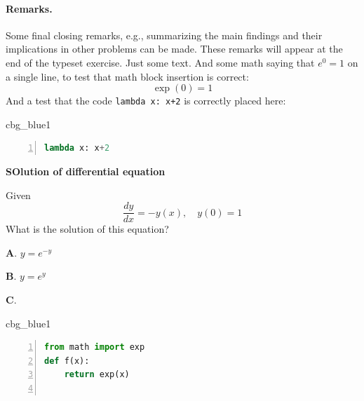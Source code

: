 \documentclass[%
oneside,                 %
final,                   %
10pt]{article}
\newenvironment{_cod_tight}[1]{
   \def\FrameCommand{\colorbox{#1}}
   \FrameRule0.6pt\MakeFramed {\FrameRestore}\vskip3mm}
   {\vskip0mm\endMakeFramed}
\newenvironment{cod}[1]{
\bgroup\rmfamily
\fboxsep=0mm\relax
\begin{_cod_tight}{#1}
\list{}{\parsep=-2mm\parskip=0mm\topsep=0pt\leftmargin=2mm
\rightmargin=2\leftmargin\leftmargin=4pt\relax}
\item\relax}
{\endlist\end{_cod_tight}\egroup}
\newenvironment{doconcequiz}{}{}
\newcounter{doconcequizcounter}
\newenvironment{doconceexercise}{}{}
\newcounter{doconceexercisecounter}
\theoremstyle{definition}
\begin{document}
\begin{enumerate}
\begin{doconceexercise}
\paragraph{Remarks.}
Some final closing remarks, e.g., summarizing the main findings
and their implications in other problems can be made. These
remarks will appear at the end of the typeset exercise.
\end{doconceexercise}
\begin{doconceexercise}
Just some text. And some math saying that $e^0=1$ on a single line,
to test that math block insertion is correct:
\[ \exp{(0)} = 1 \]
And a test that the code \texttt{lambda x: x+2} is correctly placed here:
\begin{cod}{cbg_blue1}\begin{lstlisting}[language=Python,style=myspeciallststyle,numbers=left,numberstyle=\tiny,stepnumber=3,numbersep=15pt,xleftmargin=1mm]
lambda x: x+2

\end{lstlisting}\end{cod}
\noindent

\end{doconceexercise}
\begin{doconceexercise}
                             
\label{sec:this:exer:de}

\begin{doconcequiz}
\label{quiz:diff:eq1}


\noindent\textbf{\large SOlution of differential equation}

\noindent
Given
\[ \frac{dy}{dx} = -y(x),\quad y(0)=1 \]
What is the solution of this equation?

\vspace{2mm}

\textbf{A}. 
$y=e^{-y}$

\textbf{B}. 
$y=e^{y}$

\textbf{C}. 
\begin{cod}{cbg_blue1}\begin{lstlisting}[language=Python,style=myspeciallststyle,numbers=left,numberstyle=\tiny,stepnumber=3,numbersep=15pt,xleftmargin=1mm]
from math import exp
def f(x):
    return exp(x)


\end{lstlisting}
\end{cod}
\end{doconcequiz}
\end{doconceexercise}
\end{enumerate}
\end{document}
